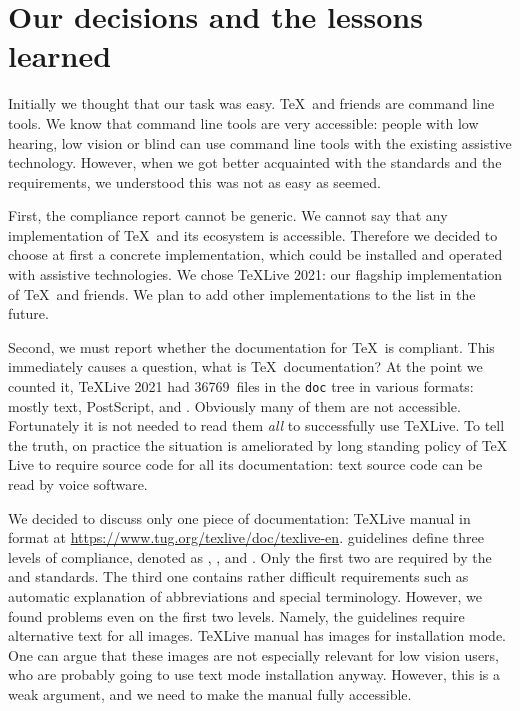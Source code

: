 \documentclass{ltugboat}
\begin{document}
\section{Our decisions and the lessons learned}
\label{sec:decisions}

Initially we thought that our task was easy.  \TeX\ and friends are
command line tools.  We know that command line tools are very
accessible: people with low hearing, low vision or blind can use
command line tools with the existing assistive technology.  However,
when we got better acquainted with the standards and the requirements,
we understood this was not as easy as seemed.

First, the compliance report cannot be generic.  We cannot say that
any implementation of \TeX\ and its ecosystem is accessible.
Therefore we decided to choose at first a concrete implementation,
which could be installed and operated with assistive technologies.  We
chose \TeX Live 2021: our flagship implementation of \TeX\ and
friends.  We plan to add other implementations to the list in the
future.

Second, we must report whether the documentation for \TeX\ is
compliant.  This immediately causes a question, what is \TeX\
documentation?  At the point we counted it, \TeX Live 2021 had
\num{36769}~files in the \texttt{doc} tree in various formats: mostly
text, PostScript, \acro{PDF} and \acro{HTML}.  Obviously many of them
are not accessible.  Fortunately it is not needed to read them
\emph{all} to successfully use \TeX Live.  To tell the truth, on
practice the situation is ameliorated by long standing policy of \TeX
Live to require source code for all its documentation:  text source
code can be read by voice software.  

We decided to discuss only one piece of documentation: \TeX Live
manual in \acro{HTML} format at
\url{https://www.tug.org/texlive/doc/texlive-en}.
 guidelines define three levels of compliance, denoted as
\acro{A}, \acro{AA}, and \acro{AAA}.  Only the first two are required
by the \acro{US} and \acro{EU} standards.  The third one contains
rather difficult requirements such as automatic explanation of
abbreviations and special terminology.  However, we found problems
even on the first two levels.  Namely, the guidelines require
alternative text for all images.  \TeX Live manual has images for
\acro{GUI} installation mode.  One can argue that these images are
not especially relevant for low vision users, who are probably going
to use text mode installation anyway.  However, this is a weak
argument, and we need to make the manual fully accessible.
\end{document}
